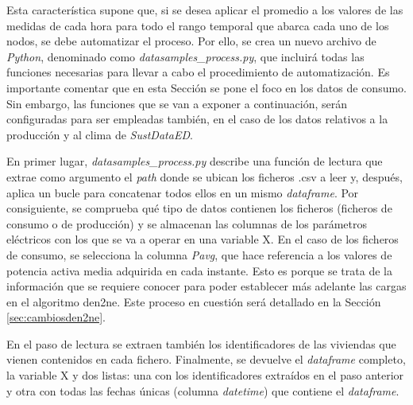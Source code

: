 Esta característica supone que, si se desea aplicar el promedio a los valores de las medidas de cada hora para todo el rango temporal que abarca cada uno de los nodos, se debe automatizar el proceso. Por ello, se crea un nuevo archivo de \textit{Python}, denominado como \textit{datasamples\_process.py}, que incluirá todas las funciones necesarias para llevar a cabo el procedimiento de automatización. Es importante comentar que en esta Sección se pone el foco en los datos de consumo. Sin embargo, las funciones que se van a exponer a continuación, serán configuradas para ser empleadas también, en el caso de los datos relativos a la producción y al clima de \textit{SustDataED}.

\vspace{3mm}

En primer lugar, \textit{datasamples\_process.py} describe una función de lectura que extrae como argumento el \textit{path} donde se ubican los ficheros .csv a leer y, después, aplica un bucle para concatenar todos ellos en un mismo \textit{dataframe}. Por consiguiente, se comprueba qué tipo de datos contienen los ficheros (ficheros de consumo o de producción) y se almacenan las columnas de los parámetros eléctricos con los que se va a operar en una variable X. En el caso de los ficheros de consumo, se selecciona la columna \textit{Pavg}, que hace referencia a los valores de potencia activa media adquirida en cada instante. Esto es porque se trata de la información que se requiere conocer para poder establecer más adelante las cargas en el algoritmo \gls{den2ne}. Este proceso en cuestión será detallado en la Sección \ref{sec:cambiosden2ne}.

\vspace{3mm}

En el paso de lectura se extraen también los identificadores de las viviendas que vienen contenidos en cada fichero. Finalmente, se devuelve el \textit{dataframe} completo, la variable X y dos listas: una con los identificadores extraídos en el paso anterior y otra con todas las fechas únicas (columna \textit{datetime}) que contiene el \textit{dataframe}.

\vspace{3mm}

